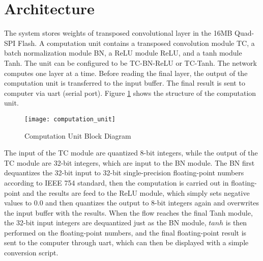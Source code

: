 \section{Architecture}

The system stores weights of transposed convolutional layer in the 16MB Quad-SPI Flash. A computation unit
contains a transposed convolution module TC, a batch normalization module BN, a ReLU module ReLU,
and a tanh module Tanh. The unit can be configured to be TC-BN-ReLU or TC-Tanh. The network computes one
layer at a time. Before reading the final layer, the output of the computation unit is transferred to the
input buffer. The final result is sent to computer via \gls{uart} (serial port). Figure
\ref{fig:computation_unit} shows the structure of the computation unit.

\begin{figure}[h]
  \centering
  \texttt{[image: computation\_unit]}
  \caption{Computation Unit Block Diagram}
  \label{fig:computation_unit}
\end{figure}

The input of the TC module are quantized 8-bit integers, while the output of the TC module are 32-bit
integers, which are input to the BN module. The BN first dequantizes the 32-bit input to 32-bit
single-precision floating-point numbers according to IEEE 754 standard, then the computation is carried
out in floating-point and the results are feed to the ReLU module, which simply sets negative values to
$0.0$ and then quantizes the output to 8-bit integers again and overwrites the input buffer with the
results. When the flow reaches the final Tanh module, the 32-bit input integers are dequantized just as the
BN module, $tanh$ is then performed on the floating-point numbers, and the final floating-point result is
sent to the computer through \gls{uart}, which can then be displayed with a simple conversion script.

\clearpage %
